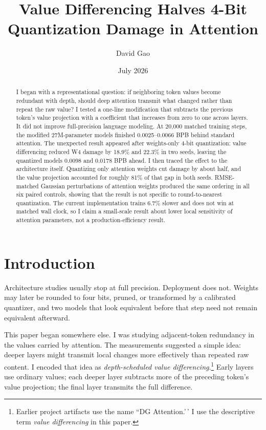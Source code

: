 \documentclass[10pt]{article}
\title{\textbf{Value Differencing Halves 4-Bit Quantization Damage in Attention}}
\author{David Gao}
\date{July 2026}
\begin{document}
\maketitle

\begin{abstract}
I began with a representational question: if neighboring token values become redundant with depth, should deep attention transmit what changed rather than repeat the raw value? I tested a one-line modification that subtracts the previous token's value projection with a coefficient that increases from zero to one across layers. It did not improve full-precision language modeling. At 20,000 matched training steps, the modified 27M-parameter models finished 0.0025--0.0066 BPB behind standard attention. The unexpected result appeared after weights-only 4-bit quantization: value differencing reduced W4 damage by 18.9\% and 22.3\% in two seeds, leaving the quantized models 0.0098 and 0.0178 BPB ahead. I then traced the effect to the architecture itself. Quantizing only attention weights cut damage by about half, and the value projection accounted for roughly 81\% of that gap in both seeds. RMSE-matched Gaussian perturbations of attention weights produced the same ordering in all six paired controls, showing that the result is not specific to round-to-nearest quantization. The current implementation trains 6.7\% slower and does not win at matched wall clock, so I claim a small-scale result about lower local sensitivity of attention parameters, not a production-efficiency result.
\end{abstract}



\section{Introduction}\label{introduction}

Architecture studies usually stop at full precision. Deployment does not. Weights may later be rounded to four bits, pruned, or transformed by a calibrated quantizer, and two models that look equivalent before that step need not remain equivalent afterward.

This paper began somewhere else. I was studying adjacent-token redundancy in the values carried by attention. The measurements suggested a simple idea: deeper layers might transmit local changes more effectively than repeated raw content. I encoded that idea as \emph{depth-scheduled value differencing}.\footnote{Earlier project artifacts use the name ``DG Attention.'\,' I use the descriptive term \emph{value differencing} in this paper.} Early layers use ordinary values; each deeper layer subtracts more of the preceding token's value projection; the final layer transmits the full difference.
\end{document}
